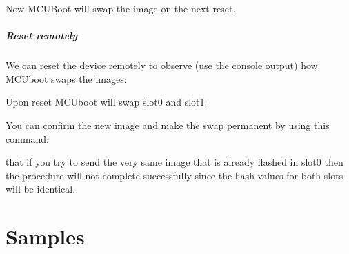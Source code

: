 \documentclass[letterpaper,10pt,english]{sphinxmanual}
\begin{document}
\begin{sphinxVerbatim}[commandchars=\\\{\}]
\end{sphinxVerbatim}

Now MCUBoot will swap the image on the next reset.


\paragraph{Reset remotely}
\label{\detokenize{fota/smp_svr:reset-remotely}}
We can reset the device remotely to observe (use the console output) how
MCUboot swaps the images:

\begin{sphinxVerbatim}[commandchars=\\\{\}]
\end{sphinxVerbatim}

Upon reset MCUboot will swap slot\sphinxhyphen{}0 and slot\sphinxhyphen{}1.

You can confirm the new image and make the swap permanent by using this command:

\begin{sphinxVerbatim}[commandchars=\\\{\}]
\end{sphinxVerbatim}

 that if you try to send the very same image that is already flashed in
slot\sphinxhyphen{}0 then the procedure will not complete successfully since the hash values
for both slots will be identical.
\begin{quote}
\end{quote}


\chapter{Samples}
\label{\detokenize{samples/index:samples}}\label{\detokenize{samples/index:id1}}\label{\detokenize{samples/index::doc}}
\end{document}
